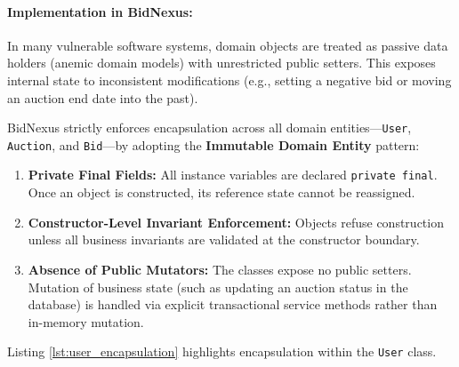 \paragraph{Implementation in BidNexus:}
In many vulnerable software systems, domain objects are treated as passive data holders (anemic domain models) with unrestricted public setters. This exposes internal state to inconsistent modifications (e.g., setting a negative bid or moving an auction end date into the past).

BidNexus strictly enforces encapsulation across all domain entities---\texttt{User}, \texttt{Auction}, and \texttt{Bid}---by adopting the \textbf{Immutable Domain Entity} pattern:
\begin{enumerate}
    \item \textbf{Private Final Fields:} All instance variables are declared \texttt{private final}. Once an object is constructed, its reference state cannot be reassigned.
    \item \textbf{Constructor-Level Invariant Enforcement:} Objects refuse construction unless all business invariants are validated at the constructor boundary.
    \item \textbf{Absence of Public Mutators:} The classes expose no public setters. Mutation of business state (such as updating an auction status in the database) is handled via explicit transactional service methods rather than in-memory mutation.
\end{enumerate}

Listing \ref{lst:user_encapsulation} highlights encapsulation within the \texttt{User} class.

